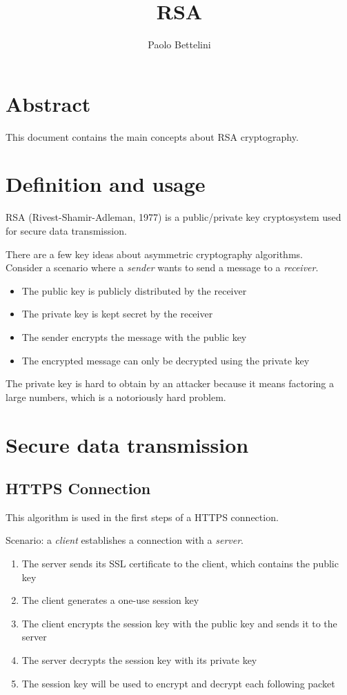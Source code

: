 \documentclass{article}
\title{RSA}
\author{Paolo Bettelini}
\date{}
\begin{document}
\maketitle

\section*{Abstract}
This document contains the main concepts about RSA cryptography.

\pagebreak

\tableofcontents
\pagebreak

\section{Definition and usage}


RSA (Rivest-Shamir-Adleman, 1977) is a public/private key cryptosystem used for secure data transmission.

There are a few key ideas about asymmetric cryptography algorithms.
\\
Consider a scenario where a \textit{sender} wants to send a message to a \textit{receiver}.
\begin{itemize}
	\item The public key is publicly distributed by the receiver
	\item The private key is kept secret by the receiver
	\item The sender encrypts the message with the public key
	\item The encrypted message can only be decrypted using the private key
\end{itemize}

The private key is hard to obtain by an attacker because it means factoring a large numbers, which is a notoriously hard problem.

\section{Secure data transmission}

\subsection{HTTPS Connection}

This algorithm is used in the first steps of a HTTPS connection.

Scenario: a \textit{client} establishes a connection with a \textit{server}.
\begin{enumerate}
	\item The server sends its SSL certificate to the client, which contains the public key
	\item The client generates a one-use session key
	\item The client encrypts the session key with the public key and sends it to the server
	\item The server decrypts the session key with its private key
	\item The session key will be used to encrypt and decrypt each following packet
\end{enumerate}
\end{document}
